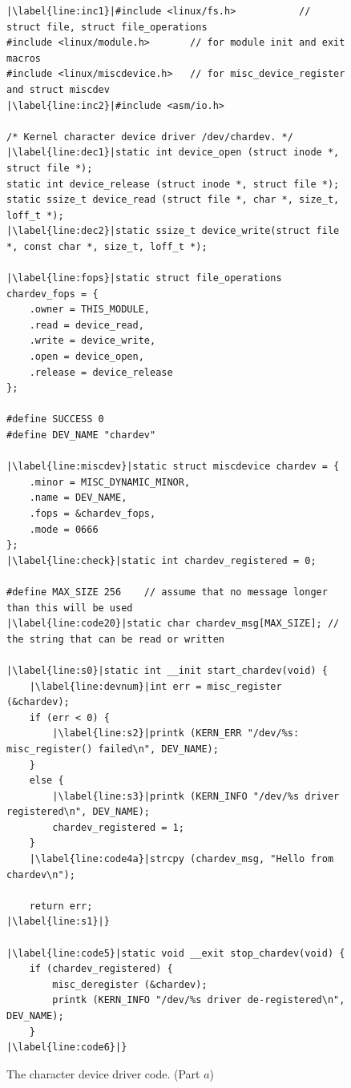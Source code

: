\documentclass[epsfig,10pt,fullpage]{article}
\begin{document}
\lstset{language=C,numbers=left,escapechar=|}
\begin{figure}[H]
\begin{center}
\begin{minipage}[t]{15 cm}
\begin{lstlisting}[name=chardev]
|\label{line:inc1}|#include <linux/fs.h>           // struct file, struct file_operations
#include <linux/module.h>       // for module init and exit macros
#include <linux/miscdevice.h>   // for misc_device_register and struct miscdev
|\label{line:inc2}|#include <asm/io.h>  

/* Kernel character device driver /dev/chardev. */
|\label{line:dec1}|static int device_open (struct inode *, struct file *);
static int device_release (struct inode *, struct file *);
static ssize_t device_read (struct file *, char *, size_t, loff_t *);
|\label{line:dec2}|static ssize_t device_write(struct file *, const char *, size_t, loff_t *);

|\label{line:fops}|static struct file_operations chardev_fops = {
    .owner = THIS_MODULE,
    .read = device_read,
    .write = device_write,
    .open = device_open,
    .release = device_release
};

#define SUCCESS 0
#define DEV_NAME "chardev"

|\label{line:miscdev}|static struct miscdevice chardev = { 
    .minor = MISC_DYNAMIC_MINOR, 
    .name = DEV_NAME,
    .fops = &chardev_fops,
    .mode = 0666
};
|\label{line:check}|static int chardev_registered = 0;

#define MAX_SIZE 256	// assume that no message longer than this will be used
|\label{line:code20}|static char chardev_msg[MAX_SIZE];	// the string that can be read or written

|\label{line:s0}|static int __init start_chardev(void) {
    |\label{line:devnum}|int err = misc_register (&chardev);
    if (err < 0) {
        |\label{line:s2}|printk (KERN_ERR "/dev/%s: misc_register() failed\n", DEV_NAME);
    }
    else {
        |\label{line:s3}|printk (KERN_INFO "/dev/%s driver registered\n", DEV_NAME);
        chardev_registered = 1;
    }
    |\label{line:code4a}|strcpy (chardev_msg, "Hello from chardev\n"); 

    return err;
|\label{line:s1}|}

|\label{line:code5}|static void __exit stop_chardev(void) {
    if (chardev_registered) {
        misc_deregister (&chardev);
        printk (KERN_INFO "/dev/%s driver de-registered\n", DEV_NAME);
    }
|\label{line:code6}|}
\end{lstlisting}
\end{minipage}
\caption{The character device driver code. (Part $a$)}
\label{fig:chardev}
\end{center}
\end{figure}
\end{document}
